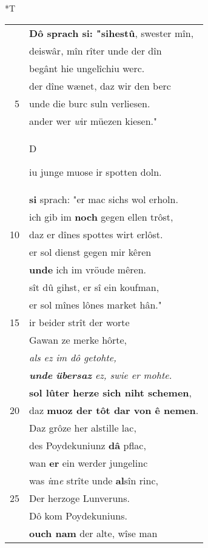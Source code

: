 \documentclass[8pt,a4paper,notitlepage]{article}
\begin{document}
\begin{table}[ht]
\hspace{0.5cm}
\begin{minipage}[t]{0.5\linewidth}
\small
\begin{center}*T
\end{center}
\begin{tabular}{rl}
 & \textbf{Dô sprach si: "sihestû}, swester mîn,\\ 
 & deiswâr, mîn rîter unde der dîn\\ 
 & begânt hie ungelîchiu werc.\\ 
 & der dîne wænet, daz wir den berc\\ 
5 & unde die burc suln verliesen.\\ 
 & ander wer \textit{w}ir müezen kiesen."\\ 
 & \begin{large}D\end{large}iu junge muose ir spotten doln.\\ 
 & \textbf{si} sprach: "er mac sichs wol erholn.\\ 
 & ich gib im \textbf{noch} gegen ellen trôst,\\ 
10 & daz er dînes spottes wirt erlôst.\\ 
 & er sol dienst gegen mir kêren\\ 
 & \textbf{unde} ich im vröude mêren.\\ 
 & sît dû gihst, er sî ein koufman,\\ 
 & er sol mînes lônes market hân."\\ 
15 & ir beider strît der worte\\ 
 & Gawan ze merke hôrte,\\ 
 & \textit{als ez im dô getohte,}\\ 
 & \textit{\textbf{unde} \textbf{übersaz} ez, swie er mohte.}\\ 
 & \textbf{sol lûter herze sich niht schemen},\\ 
20 & daz \textbf{muoz der tôt dar von ê nemen}.\\ 
 & Daz grôze her alstille lac,\\ 
 & des Poydekuniunz \textbf{dâ} pflac,\\ 
 & wan \textbf{er} ein werder jungelinc\\ 
 & was \textit{i}m\textit{e} strîte unde \textbf{al}sîn rinc,\\ 
25 & Der herzoge Lunveruns.\\ 
 & Dô kom Poydekuniuns.\\ 
 & \textbf{ouch nam} der alte, wîse man\\ 

\end{tabular}
\end{minipage}
\end{table}
\end{document}
